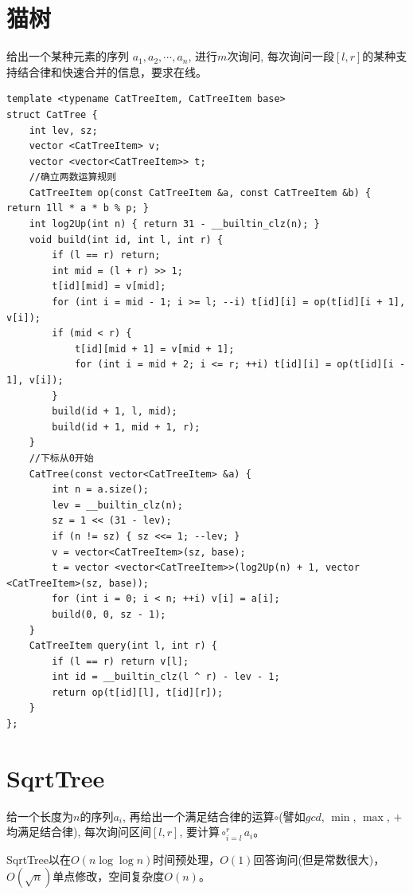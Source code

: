 \section{猫树}

给出一个某种元素的序列 $a_1, a_2, \cdots, a_n$, 进行$m$次询问, 每次询问一段$[l, r]$的某种支持结合律和快速合并的信息，要求在线。\par

\begin{lstlisting}
template <typename CatTreeItem, CatTreeItem base> 
struct CatTree {
	int lev, sz;
	vector <CatTreeItem> v;  
	vector <vector<CatTreeItem>> t;
	//确立两数运算规则
	CatTreeItem op(const CatTreeItem &a, const CatTreeItem &b) { return 1ll * a * b % p; }
	int log2Up(int n) { return 31 - __builtin_clz(n); } 
	void build(int id, int l, int r) {
		if (l == r) return;
		int mid = (l + r) >> 1;
		t[id][mid] = v[mid];
		for (int i = mid - 1; i >= l; --i) t[id][i] = op(t[id][i + 1], v[i]);
		if (mid < r) {
			t[id][mid + 1] = v[mid + 1];
			for (int i = mid + 2; i <= r; ++i) t[id][i] = op(t[id][i - 1], v[i]);
		}
		build(id + 1, l, mid);
		build(id + 1, mid + 1, r);
	}
	//下标从0开始
	CatTree(const vector<CatTreeItem> &a) {
		int n = a.size();
		lev = __builtin_clz(n);
		sz = 1 << (31 - lev);
		if (n != sz) { sz <<= 1; --lev; }
		v = vector<CatTreeItem>(sz, base);
		t = vector <vector<CatTreeItem>>(log2Up(n) + 1, vector <CatTreeItem>(sz, base));
	    for (int i = 0; i < n; ++i) v[i] = a[i];
		build(0, 0, sz - 1);
	}
	CatTreeItem query(int l, int r) {
		if (l == r) return v[l];
		int id = __builtin_clz(l ^ r) - lev - 1;
		return op(t[id][l], t[id][r]); 
	}
};
\end{lstlisting}

\section{SqrtTree}

给一个长度为$n$的序列$a_i$, 再给出一个满足结合律的运算$\circ$(譬如$gcd$, $\min$, $\max$, $+$均满足结合律), 每次询问区间$[l, r]$, 要计算$\circ_{i = l}^r a_i$。\par
SqrtTree以在$O(n \log \log n)$时间预处理，$O(1)$回答询问(但是常数很大)，$O(\sqrt{n})$单点修改，空间复杂度$O(n)$。\par


